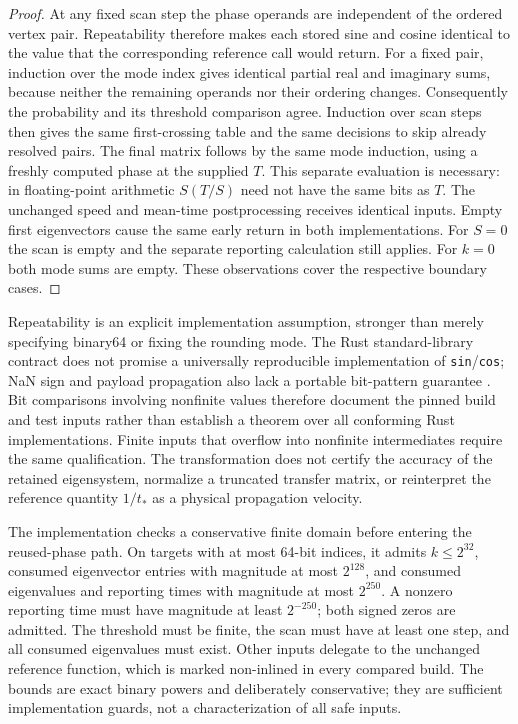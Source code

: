 \documentclass[11pt,a4paper]{article}
\theoremstyle{definition}\newtheorem{definition}[theorem]{Definition}
\begin{document}
\begin{proof}
At any fixed scan step the phase operands are independent of the ordered
vertex pair.  Repeatability therefore makes each stored sine and cosine
identical to the value that the corresponding reference call would return.
For a fixed pair, induction over the mode index gives identical partial real
and imaginary sums, because neither the remaining operands nor their ordering
changes.  Consequently the probability and its threshold comparison agree.
Induction over scan steps then gives the same first-crossing table and the
same decisions to skip already resolved pairs.  The final matrix follows by
the same mode induction, using a freshly computed phase at the supplied $T$.
This separate evaluation is necessary: in floating-point arithmetic
$S(T/S)$ need not have the same bits as $T$.  The unchanged speed and mean-time
postprocessing receives identical inputs.  Empty first eigenvectors cause the
same early return in both implementations.  For $S=0$ the scan is empty and
the separate reporting calculation still applies.  For $k=0$ both mode sums
are empty.  These observations cover the respective boundary cases.
\end{proof}

Repeatability is an explicit implementation assumption, stronger than merely
specifying binary64 or fixing the rounding mode.  The Rust standard-library
contract does not promise a universally reproducible implementation of
\texttt{sin}/\texttt{cos}; NaN sign and payload propagation also lack a portable
bit-pattern guarantee \cite{rustf64docs}.  Bit comparisons involving nonfinite values therefore
document the pinned build and test inputs rather than establish a theorem over
all conforming Rust implementations.  Finite inputs that overflow into
nonfinite intermediates require the same qualification.  The transformation
does not certify the accuracy of the retained eigensystem, normalize a
truncated transfer matrix, or reinterpret the reference quantity $1/t_*$ as
a physical propagation velocity.

The implementation checks a conservative finite domain before entering the reused-phase path. On targets with at most 64-bit indices, it admits $k\leq2^{32}$, consumed eigenvector entries with magnitude at most $2^{128}$, and consumed eigenvalues and reporting times with magnitude at most $2^{250}$. A nonzero reporting time must have magnitude at least $2^{-250}$; both signed zeros are admitted. The threshold must be finite, the scan must have at least one step, and all consumed eigenvalues must exist. Other inputs delegate to the unchanged reference function, which is marked non-inlined in every compared build. The bounds are exact binary powers and deliberately conservative; they are sufficient implementation guards, not a characterization of all safe inputs.
\end{document}
